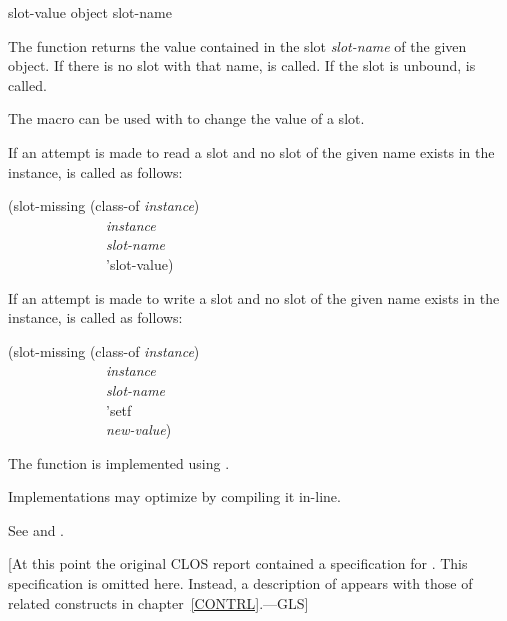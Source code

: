 \begin{defun}[Function]
slot-value object slot-name

The function  returns the value contained in the slot
\emph{slot-name} of the given object.  If there is no slot with that
name,  is called.  If the slot is unbound,
 is called.

The macro  can be used with  to change the value
of a slot. 

If an attempt is made to read a slot and no slot of the given name
exists in the instance,  is called as follows: 
\begin{lisp}
(slot-missing (class-of \emph{instance}) \\
~~~~~~~~~~~~~~\emph{instance} \\
~~~~~~~~~~~~~~\emph{slot-name} \\
~~~~~~~~~~~~~~'slot-value)
\end{lisp}

If an attempt is made to write a slot and no slot of the given name
exists in the instance,  is called as follows: 
\begin{lisp}
(slot-missing (class-of \emph{instance}) \\
~~~~~~~~~~~~~~\emph{instance} \\
~~~~~~~~~~~~~~\emph{slot-name} \\
~~~~~~~~~~~~~~'setf \\
~~~~~~~~~~~~~~\emph{new-value})
\end{lisp}

The function  is implemented using 
.

Implementations may optimize  by compiling it in-line.

See  and .
\end{defun}

[At this point the original CLOS report \cite{SIGPLAN-CLOS,LASC-CLOS-PART-2}
contained a specification for .
This specification is omitted here.  Instead, a description
of  appears with those of related constructs in chapter~\ref{CONTRL}.---GLS]

